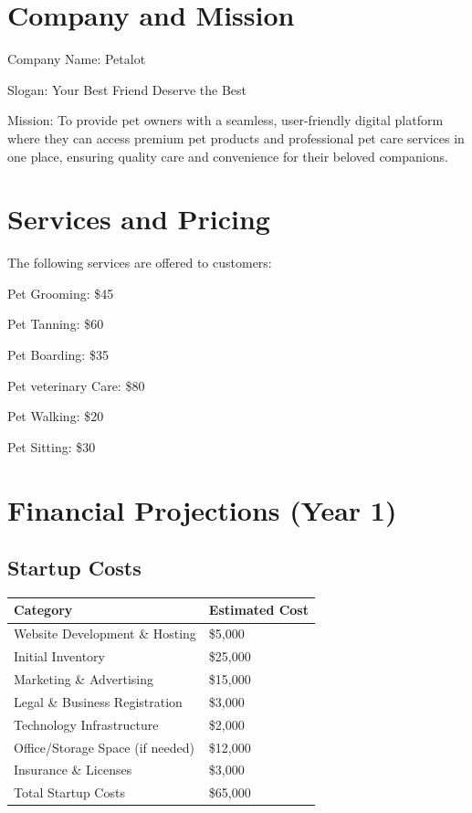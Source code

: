 \documentclass[11pt,a4paper]{article}
\begin{document}
\newpage

\tableofcontents

\newpage

\section{Company and Mission}

Company Name: Petalot 

Slogan: Your Best Friend Deserve the Best 

Mission: To provide pet owners with a seamless, user-friendly digital platform where they can access premium pet products and professional pet care services in one place, ensuring quality care and convenience for their beloved companions.

\section{Services and Pricing}
The following services are offered to customers:

Pet Grooming: \$45 

Pet Tanning: \$60 

Pet Boarding: \$35 

Pet veterinary Care: \$80 

Pet Walking: \$20 

Pet Sitting: \$30 

\section{Financial Projections (Year 1)}
\subsection{Startup Costs}
\begin{table}[h]
\centering
\begin{tabularx}{\textwidth}{lX}
\toprule
Category & Estimated Cost \\
\midrule
Website Development \& Hosting & \$5,000 \\
Initial Inventory & \$25,000 \\
Marketing \& Advertising & \$15,000 \\
Legal \& Business Registration & \$3,000 \\
Technology Infrastructure & \$2,000 \\
Office/Storage Space (if needed) & \$12,000 \\
Insurance \& Licenses & \$3,000 \\
\midrule
Total Startup Costs & \$65,000 \\
\bottomrule
\end{tabularx}
\end{table}
\end{document}
